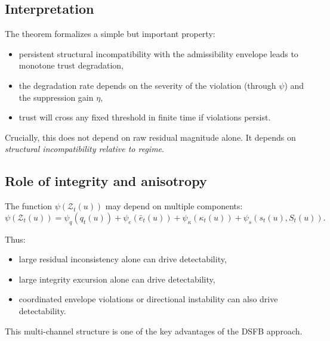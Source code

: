 \documentclass[11pt]{article}
\theoremstyle{definition}
\theoremstyle{plain}
\begin{document}

\subsection{Interpretation}

The theorem formalizes a simple but important property:

\begin{itemize}[leftmargin=1.5em]
    \item persistent structural incompatibility with the admissibility envelope leads to monotone trust degradation,
    \item the degradation rate depends on the severity of the violation (through $\psi$) and the suppression gain $\eta$,
    \item trust will cross any fixed threshold in finite time if violations persist.
\end{itemize}

Crucially, this does not depend on raw residual magnitude alone. It depends on \emph{structural incompatibility relative to regime}.


\subsection{Role of integrity and anisotropy}

The function $\psi(\mathcal{Z}_t(u))$ may depend on multiple components:
\begin{equation}
\psi(\mathcal{Z}_t(u))=
\psi_q(q_t(u))
+
\psi_e(\bar e_t(u))
+
\psi_\kappa(\kappa_t(u))
+
\psi_s(s_t(u),S_t(u)).
\end{equation}

Thus:
\begin{itemize}[leftmargin=1.5em]
    \item large residual inconsistency alone can drive detectability,
    \item large integrity excursion alone can drive detectability,
    \item coordinated envelope violations or directional instability can also drive detectability.
\end{itemize}

This multi-channel structure is one of the key advantages of the DSFB approach.
\end{document}
